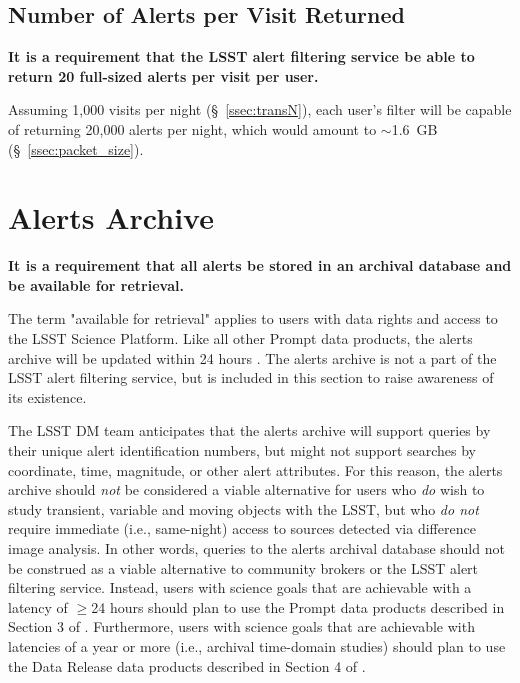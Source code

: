\documentclass[DM,authoryear,toc]{lsstdoc}
\begin{document}
\subsection{Number of Alerts per \gls{Visit} Returned}\label{ssec:LAFS_returns}

{\bf It is a requirement that the \gls{LSST} alert filtering service be able to return 20 full-sized alerts per visit per user.}

Assuming 1,000 visits per night (\S~\ref{ssec:transN}), each user's filter will be capable of returning 20,000 alerts per night, which would amount to $\sim$1.6~GB (\S~\ref{ssec:packet_size}).


\section{Alerts \gls{Archive}}\label{ssec:LAFS_adb}

{\bf It is a requirement that all alerts be stored in an archival database and be available for retrieval.}

The term "available for retrieval" applies to users with data rights and access to the \gls{LSST} \gls{Science Platform}. Like all other Prompt data products, the alerts archive will be updated within 24 hours . The alerts archive is not a part of the \gls{LSST} alert filtering service, but is included in this section to raise awareness of its existence.

The \gls{LSST} \gls{DM} team anticipates that the alerts archive will support queries by their unique alert identification numbers, but might not support searches by coordinate, time, magnitude, or other alert attributes. For this reason, the alerts archive should {\em not} be considered a viable alternative for users who {\em do} wish to study \gls{transient}, variable and moving objects with the \gls{LSST}, but who {\em do not} require immediate (i.e., same-night) access to sources detected via difference image analysis. In other words, queries to the alerts archival database should not be construed as a viable alternative to community brokers or the \gls{LSST} alert filtering service. Instead, users with science goals that are achievable with a latency of $\geq$24 hours should plan to use the Prompt data products described in Section 3 of . Furthermore, users with science goals that are achievable with latencies of a year or more (i.e., archival time-domain studies) should plan to use the Data \gls{Release} data products described in Section 4 of .


\appendix
\label{sec:bib}


\label{sec:acronyms}
\printglossaries
\end{document}
